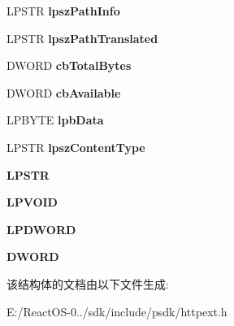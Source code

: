 \begin{DoxyCompactItemize}
L\+P\+S\+TR {\bfseries lpsz\+Path\+Info}
\item 
\mbox{\label{struct___e_x_t_e_n_s_i_o_n___c_o_n_t_r_o_l___b_l_o_c_k_ac111a4e0f5fb2a825eacde817750cb0d}} 
L\+P\+S\+TR {\bfseries lpsz\+Path\+Translated}
\item 
\mbox{\label{struct___e_x_t_e_n_s_i_o_n___c_o_n_t_r_o_l___b_l_o_c_k_af7a809b4e80b9617219efa145758c060}} 
D\+W\+O\+RD {\bfseries cb\+Total\+Bytes}
\item 
\mbox{\label{struct___e_x_t_e_n_s_i_o_n___c_o_n_t_r_o_l___b_l_o_c_k_a0561e0df6ec2c057d9a64688fa8786a0}} 
D\+W\+O\+RD {\bfseries cb\+Available}
\item 
\mbox{\label{struct___e_x_t_e_n_s_i_o_n___c_o_n_t_r_o_l___b_l_o_c_k_a13905a20ddbda6dbfe67a5ef6e980f14}} 
L\+P\+B\+Y\+TE {\bfseries lpb\+Data}
\item 
\mbox{\label{struct___e_x_t_e_n_s_i_o_n___c_o_n_t_r_o_l___b_l_o_c_k_ae0f35ef8916f4005df70994781400641}} 
L\+P\+S\+TR {\bfseries lpsz\+Content\+Type}
\item 
\mbox{\label{struct___e_x_t_e_n_s_i_o_n___c_o_n_t_r_o_l___b_l_o_c_k_a1318cfaf163e28aaa7a6736a7f94e8d2}} 
{\bfseries L\+P\+S\+TR}
\item 
\mbox{\label{struct___e_x_t_e_n_s_i_o_n___c_o_n_t_r_o_l___b_l_o_c_k_a44e63251a5c3921bb848d2422957af4a}} 
{\bfseries L\+P\+V\+O\+ID}
\item 
\mbox{\label{struct___e_x_t_e_n_s_i_o_n___c_o_n_t_r_o_l___b_l_o_c_k_aa7098e476a465a41ce229166dcd2617e}} 
{\bfseries L\+P\+D\+W\+O\+RD}
\item 
\mbox{\label{struct___e_x_t_e_n_s_i_o_n___c_o_n_t_r_o_l___b_l_o_c_k_a97b5cce66a5062dc129000440b547cfd}} 
{\bfseries D\+W\+O\+RD}
\end{DoxyCompactItemize}


该结构体的文档由以下文件生成\+:\begin{DoxyCompactItemize}
\item 
E\+:/\+React\+O\+S-\/0../sdk/include/psdk/httpext.\+h\end{DoxyCompactItemize}
